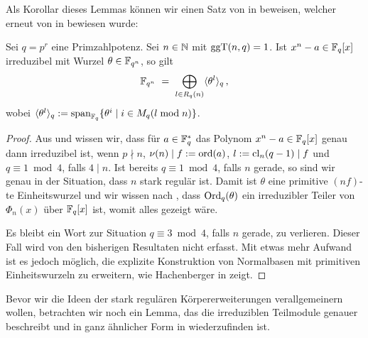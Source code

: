 Als Korollar dieses Lemmas können wir einen Satz von \citeauthor{semaev:1989}
\citeyear{semaev:1989} in 
\autocite{semaev:1989} beweisen, welcher erneut von \citeauthor{gao:1997}
\citeyear{gao:1997} in \autocite{gao:1997} bewiesen wurde:

\begin{satz}
  \label{satz:gao1}
  Sei $q = p^r$ eine Primzahlpotenz. Sei $n \in \mathbb{N}$ mit $\operatorname{ggT}(n,q)=1$.
  Ist $x^n - a \in \mathbb{F}_q[x]$ irreduzibel mit Wurzel $\theta\in \mathbb{F}_{q^n}$, so
  gilt 
  \[ \mathbb{F}_{q^n} \ =\  \bigoplus_{l\in R_q(n)} \langle \theta^l\rangle_q\,,\]
  wobei $\langle \theta^l\rangle_q := 
  \operatorname{span}_{\mathbb{F}_q}\{ \theta^i \mid i\in M_q(l\bmod n)\}$.
\end{satz}
\begin{proof}
  Aus  und 
  wissen wir, dass für $a \in \mathbb{F}_q^\ast$ das Polynom
  $x^n-a \in \mathbb{F}_q[x]$ genau dann irreduzibel ist, wenn
  $p\nmid n$, $\nu(n) \mid f := \operatorname{ord}(a)$, $l := \operatorname{cl}_n(q-1)\mid f$ und
  $q \equiv 1 \bmod 4$, falls $4\mid n$. 
  Ist bereits $q\equiv 1 \bmod 4$, falls $n$ gerade, so sind wir genau in der 
  Situation, dass $n$ stark regulär ist.
  Damit ist $\theta$ eine primitive $(nf)$-te Einheitswurzel und wir wissen
  nach , dass
  $\operatorname{Ord}_q(\theta)$ ein irreduzibler Teiler von $\Phi_n(x)$ über $\mathbb{F}_q[x]$ ist,
  womit alles gezeigt wäre.

  Es bleibt ein Wort zur Situation $q\equiv 3 \bmod 4$, falls $n$ gerade, zu
  verlieren. Dieser Fall wird von den bisherigen Resultaten nicht erfasst.
  Mit etwas mehr Aufwand ist es jedoch möglich, die explizite Konstruktion 
  von Normalbasen mit primitiven Einheitswurzeln zu erweitern, wie Hachenberger
  in \autocite[Section 22]{hachenberger1997finite} zeigt.
\end{proof}

Bevor wir die Ideen der stark regulären Körpererweiterungen verallgemeinern
wollen, betrachten wir noch ein Lemma, das die irreduziblen Teilmodule genauer
beschreibt und in ganz ähnlicher Form in \autocite[Theorem
22.5]{hachenberger1997finite} wiederzufinden ist.

